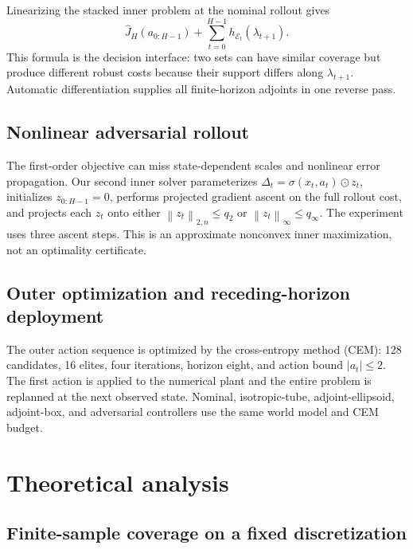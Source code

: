 \documentclass[10pt]{article}
\newcommand{\normn}[1]{\left\lVert #1\right\rVert_{2,n}}
\newcommand{\norminf}[1]{\left\lVert #1\right\rVert_{\infty}}
\begin{document}
Linearizing the stacked inner problem at the nominal rollout gives
\begin{equation}
\widehat J_H(a_{0:H-1})+
\sum_{t=0}^{H-1}h_{\mathcal E_t}(\lambda_{t+1}).
\label{eq:adjoint-objective}
\end{equation}
This formula is the decision interface: two sets can have similar coverage but
produce different robust costs because their support differs along
$\lambda_{t+1}$. Automatic differentiation supplies all finite-horizon
adjoints in one reverse pass.

\subsection{Nonlinear adversarial rollout}

The first-order objective can miss state-dependent scales and nonlinear error
propagation. Our second inner solver parameterizes
$\Delta_t=\sigma(x_t,a_t)\odot z_t$, initializes $z_{0:H-1}=0$, performs
projected gradient ascent on the full rollout cost, and projects each $z_t$
onto either $\normn{z_t}\le q_2$ or
$\norminf{z_t}\le q_\infty$. The experiment uses three ascent steps. This is
an approximate nonconvex inner maximization, not an optimality certificate.

\subsection{Outer optimization and receding-horizon deployment}

The outer action sequence is optimized by the cross-entropy method (CEM): 128
candidates, 16 elites, four iterations, horizon eight, and action bound
$|a_t|\le2$. The first action is applied to the numerical plant and the entire
problem is replanned at the next observed state. Nominal, isotropic-tube,
adjoint-ellipsoid, adjoint-box, and adversarial controllers use the same world
model and CEM budget.

\section{Theoretical analysis}

\subsection{Finite-sample coverage on a fixed discretization}
\end{document}

